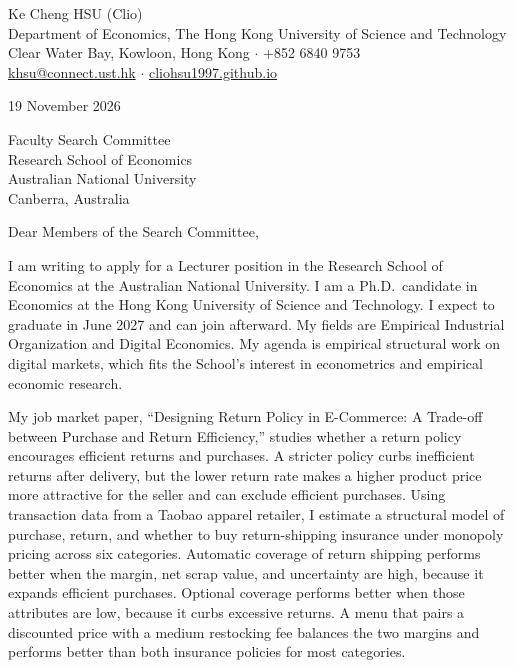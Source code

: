 \documentclass[11pt]{article}
\begin{document}
\begin{flushleft}
Ke Cheng HSU (Clio) \\
Department of Economics, The Hong Kong University of Science and Technology \\
Clear Water Bay, Kowloon, Hong Kong $\cdot$ +852 6840 9753 \\
\href{mailto:khsu@connect.ust.hk}{khsu@connect.ust.hk} $\cdot$ \href{https://cliohsu1997.github.io/}{cliohsu1997.github.io}
\end{flushleft}

19 November 2026

\vspace{0.12em}
Faculty Search Committee \\
Research School of Economics \\
Australian National University \\
Canberra, Australia

\vspace{0.12em}
Dear Members of the Search Committee,

I am writing to apply for a Lecturer position in the Research School of Economics at the Australian National University. I am a Ph.D.\ candidate in Economics at the Hong Kong University of Science and Technology. I expect to graduate in June 2027 and can join afterward. My fields are Empirical Industrial Organization and Digital Economics. My agenda is empirical structural work on digital markets, which fits the School's interest in econometrics and empirical economic research.

My job market paper, ``Designing Return Policy in E-Commerce: A Trade-off between Purchase and Return Efficiency,'' studies whether a return policy encourages efficient returns and purchases. A stricter policy curbs inefficient returns after delivery, but the lower return rate makes a higher product price more attractive for the seller and can exclude efficient purchases. Using transaction data from a Taobao apparel retailer, I estimate a structural model of purchase, return, and whether to buy return-shipping insurance under monopoly pricing across six categories. Automatic coverage of return shipping performs better when the margin, net scrap value, and uncertainty are high, because it expands efficient purchases. Optional coverage performs better when those attributes are low, because it curbs excessive returns. A menu that pairs a discounted price with a medium restocking fee balances the two margins and performs better than both insurance policies for most categories.
\end{document}
